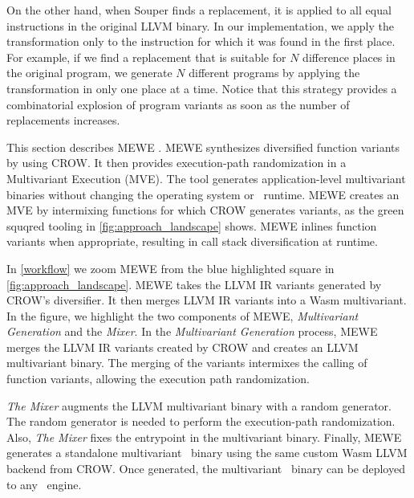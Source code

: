 On the other hand, when Souper finds a replacement, it is applied to all equal instructions in the original LLVM binary. In our implementation, we apply the transformation only to the instruction for which it was found in the first place. For example, if we find a replacement that is suitable for $N$ difference places in the original program, we generate $N$ different programs by applying the transformation in only one place at a time. Notice that this strategy provides a combinatorial explosion of program variants as soon as the number of replacements increases.



\label{section:mewe}

\renewcommand{\tool}{MEWE\xspace}
This section describes MEWE \cite{MEWE}. 
\tool synthesizes diversified function variants by using CROW.
It then provides execution-path randomization in a Multivariant Execution (MVE).
The tool generates application-level multivariant binaries without changing the operating system or \wasm\ runtime.
MEWE creates an MVE by intermixing functions for which CROW generates variants, as the green squqred tooling in \autoref{fig:approach_landscape} shows.
\tool inlines function variants when appropriate, resulting in call stack diversification at runtime.

In \autoref{workflow} we zoom MEWE from the blue highlighted square in \autoref{fig:approach_landscape}. 
MEWE takes the LLVM IR variants generated by CROW's diversifier. 
It then merges LLVM IR variants into a Wasm multivariant.
In the figure, we highlight the two components of MEWE, \emph{Multivariant Generation} and the \emph{Mixer}.
In the \emph{Multivariant Generation} process, 
MEWE merges the LLVM IR variants created by CROW and creates an LLVM multivariant binary.
The merging of the variants intermixes the calling of function variants, allowing the execution path randomization.

\emph{The Mixer} augments the LLVM multivariant binary with a random generator. 
The random generator is needed to perform the execution-path randomization.
Also, \emph{The Mixer} fixes the entrypoint in the multivariant binary.
Finally, MEWE generates a standalone multivariant \wasm\ binary using the same custom Wasm LLVM backend from CROW.
Once generated, the multivariant \wasm\ binary can be deployed to any \wasm\ engine. 

